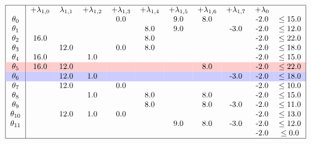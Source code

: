 \documentclass{article}
\begin{document}
    \[
        \begin{tabular}{ |c|c c c c c c c c c c| }
            \hline
            & +$\lambda_{1,0}$ & $\lambda_{1,1}$ & +$\lambda_{1,2}$ & +$\lambda_{1,3}$ & +$\lambda_{1,4}$ & +$\lambda_{1,5}$ & +$\lambda_{1,6}$ & +$\lambda_{1,7}$  & +$\lambda_{0}$ &  \\
            $\theta_{0}$ && & & 0.0 && 9.0 &8.0 && -2.0& $\leq 15.0$ \\
            $\theta_{1}$ && & & & 8.0 &9.0 && -3.0 &-2.0& $\leq 12.0$ \\
            $\theta_{2}$ &16.0 && & & 8.0 && & & -2.0& $\leq 22.0$ \\
            $\theta_{3}$ && 12.0 && 0.0 &8.0 && & & -2.0& $\leq 18.0$ \\
            $\theta_{4}$ &16.0 && 1.0 && & & & & -2.0& $\leq 15.0$ \\
            \rowcolor{red!20}
            $\theta_{5}$ &16.0 &12.0 && & & & 8.0 && -2.0& $\leq 22.0$ \\
            \rowcolor{blue!20}
            $\theta_{6}$ && 12.0 &1.0 && & & & -3.0 &-2.0& $\leq 18.0$ \\
            $\theta_{7}$ && 12.0 && 0.0 && & & & -2.0& $\leq 10.0$ \\
            $\theta_{8}$ && & 1.0 && 8.0 && 8.0 && -2.0& $\leq 15.0$ \\
            $\theta_{9}$ && & & & 8.0 && 8.0 &-3.0 &-2.0& $\leq 11.0$ \\
            $\theta_{10}$ && 12.0 &1.0 &0.0 && & & & -2.0& $\leq 13.0$ \\
            $\theta_{11}$ && & & & & 9.0 &8.0 &-3.0 &-2.0& $\leq 12.0$ \\
            && & & & &  && & -2.0 & $\leq 0.0$ \\
            \hline
        \end{tabular}
    \]
\end{document}
